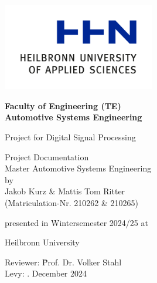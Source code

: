 \begin{titlepage}
	\centering
	\includegraphics[width=0.5\textwidth]{2023_11_29_Bilder_Dokumentation/hhn-logo.png}

	\vspace*{15mm}

	{\LARGE \textbf{Faculty of Engineering (TE)\\Automotive Systems Engineering}}

	\vspace*{15mm}

	{\Huge Project for Digital Signal Processing}

	\vspace*{15mm}

	{\Large Project Documentation}\\
	Master Automotive Systems Engineering\\

	by\\

	{\Large Jakob Kurz \& Mattis Tom Ritter}\\
	(Matriculation-Nr. 210262 \& 210265)\\

	\vspace{5mm}

	presented in Wintersemester 2024/25 at\\

	\vspace{5mm}

	{\Large Heilbronn University}

	\vspace*{10mm}

	\begin{tabbing}
		\hspace*{4cm}Reviewer: \hspace*{1cm}\=Prof. Dr. Volker Stahl\\
		\hspace*{4cm}Levy: . December 2024
	\end{tabbing}
\end{titlepage}
